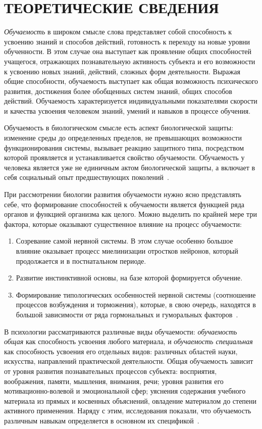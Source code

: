 \section[Теоретические сведения]{ТЕОРЕТИЧЕСКИЕ СВЕДЕНИЯ}

\textit{Обучаемость} в широком смысле слова представляет собой
способность к усвоению знаний и способов действий,
готовность к переходу на новые уровни обученности.
В этом случае она выступает как проявление общих способностей учащегося,
отражающих познавательную активность субъекта и его возможности к
усвоению новых знаний, действий, сложных форм деятельности.
Выражая общие способности, обучаемость выступает как общая возможность
психического развития, достижения более обобщенных систем знаний,
общих способов действий.
Обучаемость характеризуется индивидуальными показателями
скорости и качества усвоения человеком знаний,
умений и навыков в процессе обучения.

Обучаемость в биологическом смысле есть аспект биологической защиты:
изменение среды до определенных пределов,
не превышающих возможности функционирования системы,
вызывает реакцию защитного типа,
посредством которой проявляется и устанавливается свойство обучаемости.
Обучаемость у человека является уже не единичным актом биологической защиты,
а включает в себя социальный опыт предшествующих поколений~\cite{mandel2007}.

При рассмотрении биологии развития обучаемости нужно ясно представлять себе,
что формирование способностей к обучаемости является функцией ряда органов и
функцией организма как целого. Можно выделить по крайней мере три фактора,
которые оказывают существенное влияние на процесс обучаемости:
\begin{enumerate}
\item Созревание самой нервной системы.
  В этом случае особенно большое влияние оказывает процесс
  миелинизации отростков нейронов, который продолжается и в постнатальном периоде.
\item Развитие инстинктивной основы, на базе которой формируется обучение.
\item Формирование типологических особенностей нервной системы
  (соотношение процессов возбуждения и торможения), которые, в свою очередь,
  находятся в большой зависимости от ряда гормональных и
  гуморальных факторов~\cite{krushinskij}.
\end{enumerate}

В психологии рассматриваются различные виды обучаемости:
\textit{обучаемость общая} как способность усвоения любого материала, и
\textit{обучаемость специальная} как способность усвоения его отдельных видов:
различных областей науки, искусства, направлений практической
деятельности.
Общая обучаемость зависит от уровня развития познавательных процессов субъекта:
восприятия, воображения, памяти, мышления, внимания, речи;
уровня развития его мотивационно-волевой и эмоциональной сфер;
уяснения содержания учебного материала из прямых и косвенных объяснений,
овладение материалом до степени активного применения.
Наряду с этим, исследования показали, что обучаемость различным навыкам
определяется в основном их спецификой~\cite{druzhinin2007}.


